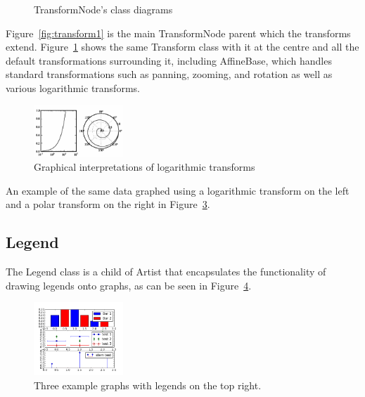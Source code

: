 \documentclass[pdftex,10pt,a4paper]{report}
\begin{document}
\begin{figure}[ht!]
\begin{subfigure}[b]{0.4\textwidth}
                \caption{}
                \label{fig:transform2}
        \end{subfigure}
        \caption{TransformNode's class diagrams}\label{fig:examples}
\end{figure}

Figure~\ref{fig:transform1} is the main TransformNode parent which the transforms extend. Figure~\ref{fig:transform2} shows the same Transform class with it at the centre and all the default transformations surrounding it, including AffineBase, which handles standard transformations such as panning, zooming, and rotation as well as various logarithmic transforms. 
\begin{figure}[ht!]
        \centering
                \includegraphics[width=0.3\textwidth]{img/umls/andrew/nonaffine_transforms}
        \caption{Graphical interpretations of logarithmic transforms}\label{fig:transform_demo}
\end{figure}
An example of the same data graphed using a logarithmic transform on the left and a polar transform on the right in Figure~\ref{fig:transform_demo}.


\subsection{Legend}
The Legend class is a child of Artist that encapsulates the functionality of drawing legends onto graphs, as can be seen in Figure~\ref{fig:legend_demo}.
\begin{figure}[ht!]
        \centering
                \includegraphics[width=0.3\textwidth]{img/umls/andrew/legend_demo}
        \caption{Three example graphs with legends on the top right.}\label{fig:legend_demo}
\end{figure}
\end{document}
